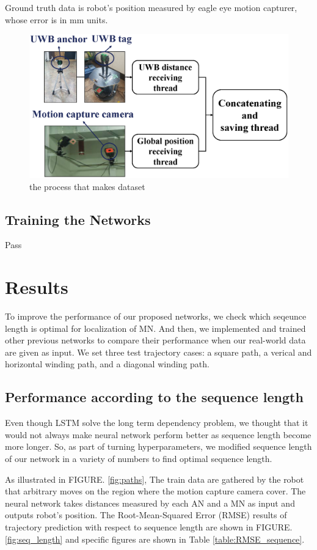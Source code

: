 \documentclass{ieeeaccess}
\begin{document}
Ground truth data is robot's position measured by eagle eye motion capturer, whose error is in mm units.
\begin{figure}[h!]
	\centering
	\includegraphics[width=0.9\linewidth]{data_sync}
	\caption{the process that makes dataset}
	\label{fig:dataset} 	
\end{figure}

\subsection{Training the Networks}

Pass

\section{Results}

To improve the performance of our proposed networks, we check which seqeunce length is optimal for localization of MN. And then, we implemented and trained other previous networks to compare their performance when our real-world data are given as input. We set three test trajectory cases: a square path, a verical and horizontal winding path, and a diagonal winding path. 

\subsection{Performance according to the sequence length}

Even though LSTM solve the long term dependency problem, we thought that it would not always make neural network perform better as sequence length become more longer. So, as part of turning hyperparameters, we modified sequence length of our network in a variety of numbers to find optimal sequence length.   

As illustrated in FIGURE. \ref{fig:paths}, The train data are gathered by the robot that arbitrary moves on the region where the motion capture camera cover. The neural network takes distances measured by each AN and a MN as input and outputs robot's position. The Root-Mean-Squared Error (RMSE) results of trajectory prediction with respect to sequence length are shown in FIGURE. \ref{fig:seq_length} and specific figures are shown in Table \ref{table:RMSE_sequence}.
\end{document}
